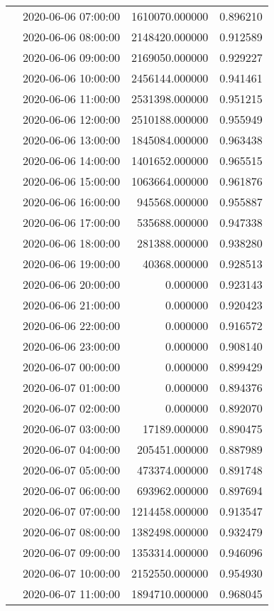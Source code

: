 \begin{tabular}{llrr}
 & 2020-06-06 07:00:00 & 1610070.000000 & 0.896210 \\
 & 2020-06-06 08:00:00 & 2148420.000000 & 0.912589 \\
 & 2020-06-06 09:00:00 & 2169050.000000 & 0.929227 \\
 & 2020-06-06 10:00:00 & 2456144.000000 & 0.941461 \\
 & 2020-06-06 11:00:00 & 2531398.000000 & 0.951215 \\
 & 2020-06-06 12:00:00 & 2510188.000000 & 0.955949 \\
 & 2020-06-06 13:00:00 & 1845084.000000 & 0.963438 \\
 & 2020-06-06 14:00:00 & 1401652.000000 & 0.965515 \\
 & 2020-06-06 15:00:00 & 1063664.000000 & 0.961876 \\
 & 2020-06-06 16:00:00 & 945568.000000 & 0.955887 \\
 & 2020-06-06 17:00:00 & 535688.000000 & 0.947338 \\
 & 2020-06-06 18:00:00 & 281388.000000 & 0.938280 \\
 & 2020-06-06 19:00:00 & 40368.000000 & 0.928513 \\
 & 2020-06-06 20:00:00 & 0.000000 & 0.923143 \\
 & 2020-06-06 21:00:00 & 0.000000 & 0.920423 \\
 & 2020-06-06 22:00:00 & 0.000000 & 0.916572 \\
 & 2020-06-06 23:00:00 & 0.000000 & 0.908140 \\
 & 2020-06-07 00:00:00 & 0.000000 & 0.899429 \\
 & 2020-06-07 01:00:00 & 0.000000 & 0.894376 \\
 & 2020-06-07 02:00:00 & 0.000000 & 0.892070 \\
 & 2020-06-07 03:00:00 & 17189.000000 & 0.890475 \\
 & 2020-06-07 04:00:00 & 205451.000000 & 0.887989 \\
 & 2020-06-07 05:00:00 & 473374.000000 & 0.891748 \\
 & 2020-06-07 06:00:00 & 693962.000000 & 0.897694 \\
 & 2020-06-07 07:00:00 & 1214458.000000 & 0.913547 \\
 & 2020-06-07 08:00:00 & 1382498.000000 & 0.932479 \\
 & 2020-06-07 09:00:00 & 1353314.000000 & 0.946096 \\
 & 2020-06-07 10:00:00 & 2152550.000000 & 0.954930 \\
 & 2020-06-07 11:00:00 & 1894710.000000 & 0.968045 \\

\end{tabular}
